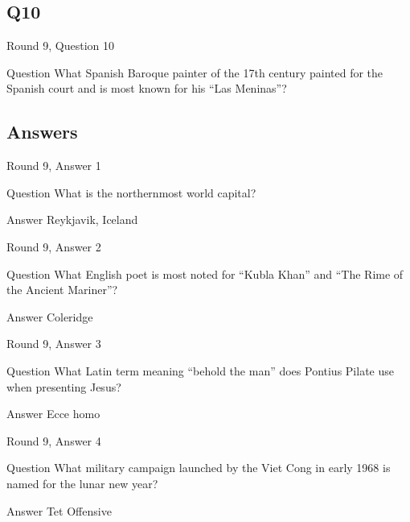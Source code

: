 \documentclass[11pt]{beamer}
\begin{document}
\subsection*{Q10}
\begin{frame}[t]{Round 9, Question 10}
\vspace{2em}
\begin{block}{Question}
What Spanish Baroque painter of the 17th century painted for the Spanish court and is most known for his ``Las Meninas''\@?
\end{block}
\end{frame}
    
\subsection{Answers}

\begin{frame}[t]{Round 9, Answer 1}
\vspace{2em}
\begin{block}{Question}
What is the northernmost world capital\@?
\end{block}
\pause{}
\begin{block}{Answer}
Reykjavik, Iceland
\end{block}
\end{frame}
    

\begin{frame}[t]{Round 9, Answer 2}
\vspace{2em}
\begin{block}{Question}
What English poet is most noted for ``Kubla Khan'' and ``The Rime of the Ancient Mariner''\@?
\end{block}
\pause{}
\begin{block}{Answer}
Coleridge
\end{block}
\end{frame}
    

\begin{frame}[t]{Round 9, Answer 3}
\vspace{2em}
\begin{block}{Question}
What Latin term meaning ``behold the man'' does Pontius Pilate use when presenting Jesus\@?
\end{block}
\pause{}
\begin{block}{Answer}
Ecce homo
\end{block}
\end{frame}
    

\begin{frame}[t]{Round 9, Answer 4}
\vspace{2em}
\begin{block}{Question}
What military campaign launched by the Viet Cong in early 1968 is named for the lunar new year\@?
\end{block}
\pause{}
\begin{block}{Answer}
Tet Offensive
\end{block}
\end{frame}
    
\end{document}
